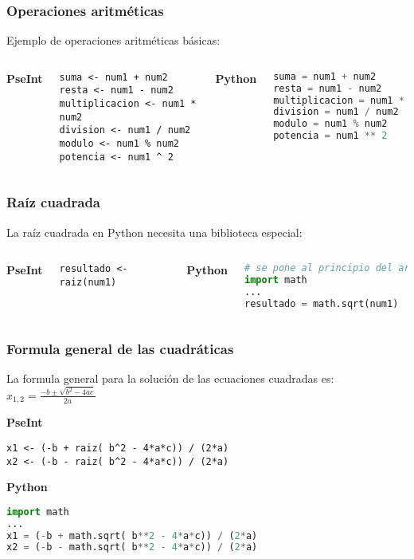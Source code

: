\begin{frame}[fragile]
  \frametitle{Operaciones aritméticas}

  Ejemplo de operaciones aritméticas básicas:
  \vspace{\baselineskip}
  \begin{columns}
      \textbf{PseInt}
      \begin{lstlisting}[style=pseudocodigo]
suma <- num1 + num2
resta <- num1 - num2
multiplicacion <- num1 * num2
division <- num1 / num2
modulo <- num1 % num2
potencia <- num1 ^ 2
      \end{lstlisting}
    \pausa
      \textbf{Python}
      \begin{lstlisting}[language=Python]
suma = num1 + num2
resta = num1 - num2
multiplicacion = num1 * num2
division = num1 / num2
modulo = num1 % num2
potencia = num1 ** 2
      \end{lstlisting}
  \end{columns}
\end{frame}

\begin{frame}[fragile]
  \frametitle{Raíz cuadrada}

  La raíz cuadrada en Python necesita una biblioteca especial:

  \vspace{\baselineskip}
  \begin{columns}
      \textbf{PseInt}
      \begin{lstlisting}[style=pseudocodigo]
resultado <- raiz(num1)
      \end{lstlisting}
    \pausa
      \textbf{Python}
      \begin{lstlisting}[language=Python]
# se pone al principio del archivo
import math
...
resultado = math.sqrt(num1)
      \end{lstlisting}
  \end{columns}
\end{frame}

\begin{frame}[fragile]
  \frametitle{Formula general de las cuadráticas}

  La formula general para la solución de las ecuaciones cuadradas es:
  $x_{1,2} = \frac{-b \pm \sqrt{b^2 - 4ac}}{2a}$

  \vspace{\baselineskip}
  \textbf{PseInt}
  \begin{lstlisting}[style=pseudocodigo]
x1 <- (-b + raiz( b^2 - 4*a*c)) / (2*a)
x2 <- (-b - raiz( b^2 - 4*a*c)) / (2*a)
  \end{lstlisting}
  \pausa

  \textbf{Python}
  \begin{lstlisting}[language=Python]
import math
...
x1 = (-b + math.sqrt( b**2 - 4*a*c)) / (2*a)
x2 = (-b - math.sqrt( b**2 - 4*a*c)) / (2*a)
  \end{lstlisting}
\end{frame}
